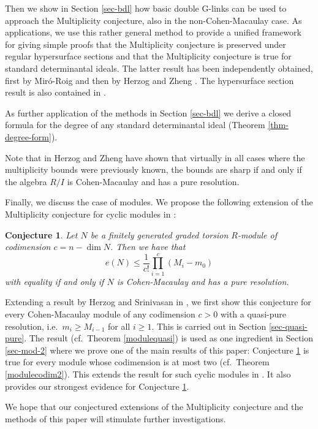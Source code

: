 \documentclass[12pt,twoside]{amsart}
\numberwithin{equation}{section}
\newtheorem{conjecture}[theorem]{Conjecture}
\theoremstyle{definition}
\begin{document}
Then we show in Section \ref{sec-bdl} how basic double G-links can be used to approach
the Multiplicity conjecture, also in the non-Cohen-Macaulay case. As applications, we use
this rather general method to provide a unified framework for giving simple proofs that
the Multiplicity conjecture is preserved under regular hypersurface sections and that the
Multiplicity conjecture is true  for standard determinantal ideals. The latter result has
been independently obtained, first by Mir\'o-Roig \cite{rosapaper} and then by Herzog and
Zheng \cite{H}. The hypersurface section result is also contained in \cite{H}.

 As further
application of the methods in Section \ref{sec-bdl} we derive a closed formula for the
degree of any standard determinantal ideal (Theorem \ref{thm-degree-form}).

Note that in \cite{H} Herzog and Zheng have shown that virtually in all cases where the
multiplicity  bounds were previously known, the bounds are sharp if and only if the
algebra $R/I$ is Cohen-Macaulay and has a pure resolution.


Finally, we discuss the case of modules. We propose the following extension of the
Multiplicity conjecture for cyclic modules in \cite{HS}:

\begin{conjecture}
\label{conj2} Let $N$ be a finitely generated graded torsion $R$-module of codimension
$c= n - \dim N$. Then we have that
$$
e(N) \leq \frac{1}{c!} \prod_{i=1}^c (M_i - m_0)
$$
with equality if and only if $N$ is Cohen-Macaulay and has a pure resolution.
\end{conjecture}


Extending a result by Herzog and Srinivasan in \cite{HS}, we  first show this conjecture
for every Cohen-Macaulay module of any codimension $c > 0$ with a quasi-pure resolution,
i.e.\ $m_i \geq M_{i-1}$ for all $i \geq 1$.  This is carried out in Section
\ref{sec-quasi-pure}. The result (cf.\ Theorem \ref{modulequasi}) is used as one
ingredient in Section \ref{sec-mod-2} where we prove one of the main results of this
paper: Conjecture \ref{conj2} is true for every module whose codimension is at most two
(cf.\ Theorem \ref{modulecodim2}). This extends the result for such cyclic modules in
\cite{roemer}. It also provides our strongest evidence for Conjecture \ref{conj2}.


We hope that our conjectured extensions of the Multiplicity conjecture and the methods of
this paper will stimulate further investigations.
\end{document}

